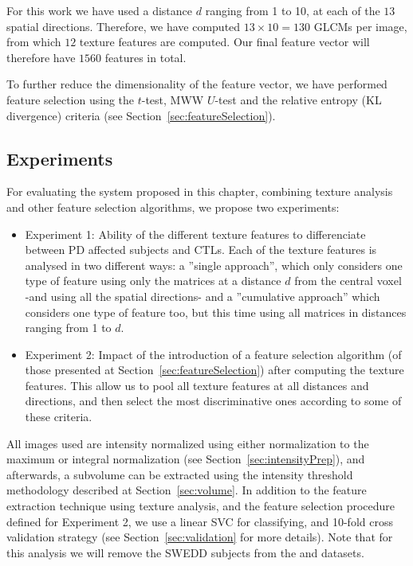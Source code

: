 For this work we have used a distance $d$ ranging from 1 to 10, at each of the $13$ spatial directions. Therefore, we have computed $13\times10=130$ \acp{GLCM} per image, from which $12$ texture features are computed. Our final feature vector will therefore have $1560$ features in total. 

To further reduce the dimensionality of the feature vector, we have performed feature selection using the $t$-test, \ac{MWW} $U$-test and the relative entropy (\ac{KL} divergence) criteria (see Section~\ref{sec:featureSelection}). 

\subsection{Experiments}
For evaluating the system proposed in this chapter, combining texture analysis and other feature selection algorithms, we propose two experiments: 
\begin{itemize}
	\item Experiment 1: Ability of the different texture features to differenciate between \ac{PD} affected subjects and \acp{CTL}. Each of the texture features is analysed in two different ways: a ''single approach'', which only considers one type of feature using only the matrices at a distance $d$ from the central voxel -and using all the spatial directions- and a ''cumulative approach'' which considers one type of feature too, but this time using all matrices in distances ranging from 1 to $d$. 
	\item Experiment 2: Impact of the introduction of a feature selection algorithm (of those presented at Section~\ref{sec:featureSelection}) after computing the texture features. This allow us to pool all texture features at all distances and directions, and then select the most discriminative ones according to some of these criteria.  
\end{itemize}

All images used are intensity normalized using either normalization to the maximum or integral normalization (see Section~\ref{sec:intensityPrep}), and afterwards, a subvolume can be extracted using the intensity threshold methodology described at Section~\ref{sec:volume}. In addition to the feature extraction technique using texture analysis, and the feature selection procedure defined for Experiment 2, we use a linear \ac{SVC} for classifying, and 10-fold cross validation strategy (see Section~\ref{sec:validation} for more details). Note that for this analysis we will remove the \ac{SWEDD} subjects from the \ppmidat{} and \vdlndat{} datasets. 


